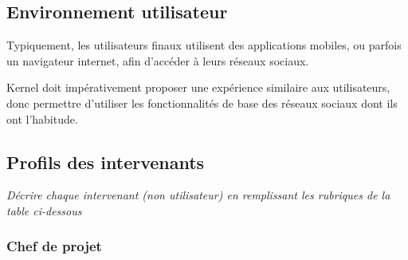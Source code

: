 \documentclass[11pt]{article}
\begin{document}
\subsection{Environnement utilisateur}

	

Typiquement, les utilisateurs finaux utilisent des applications mobiles, ou parfois un navigateur internet, afin d’accéder à leurs réseaux sociaux. 

Kernel doit impérativement proposer une expérience similaire aux utilisateurs, donc permettre d’utiliser les fonctionnalités de base des réseaux sociaux dont ils ont l'habitude.




\subsection{Profils des intervenants}

\textit{Décrire chaque intervenant (non utilisateur) en remplissant les rubriques de la table ci-dessous}

\subsubsection{Chef de projet}
\end{document}
